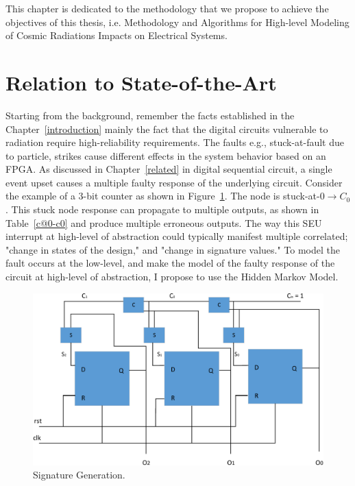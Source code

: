 
This chapter is dedicated to the methodology that we propose to achieve the objectives of this thesis, i.e. Methodology and Algorithms for High-level Modeling of Cosmic Radiations Impacts on Electrical Systems.
\label{approach}
\section{Relation to State-of-the-Art}
Starting from the background, remember the facts established in the Chapter~\ref{introduction} mainly the fact that the digital circuits vulnerable to radiation require high-reliability requirements. The faults e.g., stuck-at-fault due to particle, strikes cause different effects in the system behavior based on an FPGA. As discussed in Chapter~\ref{related} in digital sequential circuit, a single event upset causes a multiple faulty response of the underlying circuit. Consider the example of  a 3-bit counter as shown in Figure~\ref{fig:counter}. The node is stuck-at-0$\rightarrow C_0$. This stuck node response can propagate to multiple outputs, as shown in Table~\ref{c@0-c0} and produce multiple erroneous outputs. The way this SEU interrupt at high-level of abstraction could typically manifest multiple correlated; "change in states of the design," and "change in signature values." To model the fault occurs at the low-level, and make the model of the faulty response of the circuit at high-level of abstraction, I propose to use the Hidden Markov Model. 
\begin{figure}[tb!]
 \centering
  \captionsetup{justification=centering}    
   \includegraphics[scale=0.6]{Figures/counter.pdf}
   \caption{Signature Generation.}
\label{fig:counter}
\end{figure}
